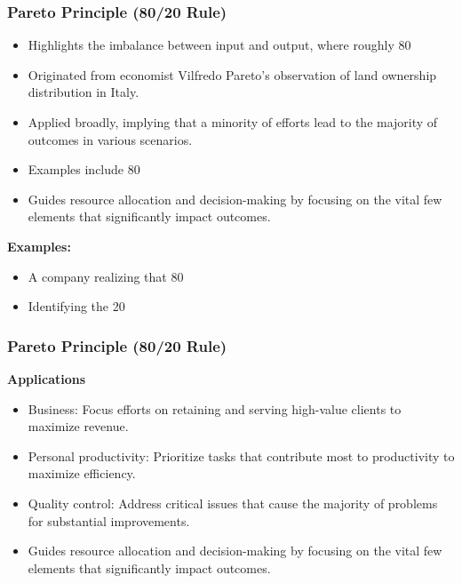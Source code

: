 \begin{frame}[fragile]\frametitle{Pareto Principle (80/20 Rule)}
\begin{itemize}
    \item Highlights the imbalance between input and output, where roughly 80%
    \item Originated from economist Vilfredo Pareto's observation of land ownership distribution in Italy.
    \item Applied broadly, implying that a minority of efforts lead to the majority of outcomes in various scenarios.
    \item Examples include 80%
    \item Guides resource allocation and decision-making by focusing on the vital few elements that significantly impact outcomes.
\end{itemize}
\textbf{Examples:}
\begin{itemize}
    \item A company realizing that 80%
    \item Identifying the 20%
\end{itemize}
\end{frame}

\begin{frame}[fragile]\frametitle{Pareto Principle (80/20 Rule)}
\textbf{Applications}
\begin{itemize}
    \item Business: Focus efforts on retaining and serving high-value clients to maximize revenue.
    \item Personal productivity: Prioritize tasks that contribute most to productivity to maximize efficiency.
    \item Quality control: Address critical issues that cause the majority of problems for substantial improvements.
    \item Guides resource allocation and decision-making by focusing on the vital few elements that significantly impact outcomes.
\end{itemize}
\end{frame}



